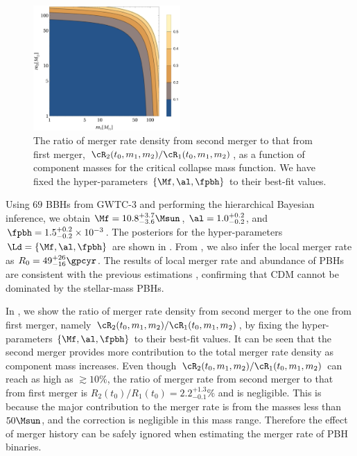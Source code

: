 \documentclass[twocolumn]{aastex631}
\begin{document}
\begin{figure}[tbp!]
	\centering
	\includegraphics[width=0.5\textwidth]{ratio-CC.pdf}
	\caption{\label{ratio-CC}The ratio of merger rate density from second merger to that from first merger, $\cR_2(t_0, m_1, m_2)/\cR_1(t_0, m_1, m_2)$, as a function of component masses for the critical collapse mass function. We have fixed the hyper-parameters $\{\Mf, \al, \fpbh\}$ to their best-fit values.}
\end{figure}

Using $69$ BBHs from GWTC-3 and performing the hierarchical Bayesian inference, we obtain $\Mf = 10.8^{+3.7}_{-3.6} \Msun$, $\al = 1.0^{+0.2}_{-0.2}$, and $\fpbh = 1.5^{+0.2}_{-0.2} \times 10^{-3}$. The posteriors for the hyper-parameters $\Ld = \{\Mf, \al, \fpbh\}$ are shown in . From , we also infer the local merger rate as $R_0 = 49^{+26}_{-16} \gpcyr$. The results of local merger rate and abundance of PBHs are consistent with the previous estimations \citep{Chen:2018czv,Chen:2018rzo,Chen:2019irf,Wu:2020drm,Chen:2021nxo,Chen:2022fda}, confirming that CDM cannot be dominated by the stellar-mass PBHs. 

In , we show the ratio of merger rate density from second merger to the one from first merger, namely $\cR_2(t_0, m_1, m_2)/\cR_1(t_0, m_1, m_2)$, by fixing the hyper-parameters $\{\Mf, \al, \fpbh\}$ to their best-fit values. It can be seen that the second merger provides more contribution to the total merger rate density as component mass increases. Even though $\cR_2(t_0, m_1, m_2)/\cR_1(t_0, m_1, m_2)$ can reach as high as $\gtrsim 10\%$, the ratio of merger rate from second merger to that from first merger is $R_2(t_0)/R_1(t_0) = 2.2^{+1.3}_{-0.1}\%$ and is negligible. This is because the major contribution to the merger rate is from the masses less than $50\Msun$, and the correction is negligible in this mass range. Therefore the effect of merger history can be safely ignored when estimating the merger rate of PBH binaries.
\end{document}
